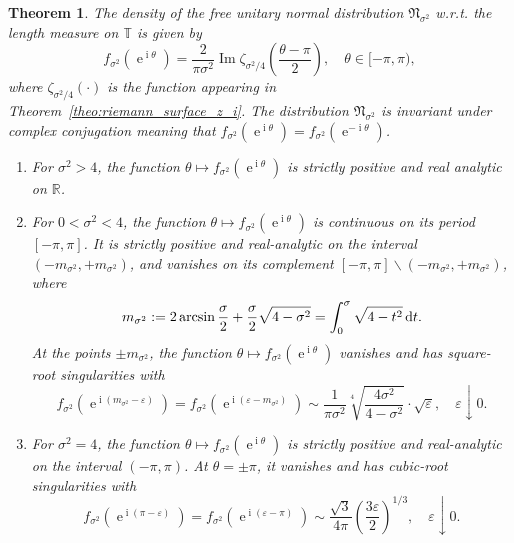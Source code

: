 \documentclass[10pt]{amsart}
\newtheorem{theo}{Theorem}[section]
\theoremstyle{definition}\newtheorem{defi}[theo]{Definition}\newtheorem{rema}[theo]{Remark}\newtheorem{exam}[theo]{Example}\newtheorem{exem}[theo]{Example}\newtheorem{nota}[theo]{Notation}
\DeclareMathOperator{\Imm}{Im}
\DeclareMathOperator{\eee}{e}
\DeclareMathOperator{\ii}{i}
\newcommand{\fnorm}{\mathfrak{N}}
\newcommand{\bT}{\mathbb{T}}
\newcommand{\R}{\mathbb{R}}
\newcommand*\dint{\text{\normalfont d}}
\newcommand{\eps}{\varepsilon}
\newcommand*{\relabel}{\renewcommand{\labelenumi}{(\theenumi)}}
\newcommand*{\alphenumi}{\renewcommand*{\theenumi}{\alph{enumi}}\relabel}
\begin{document}
\begin{theo}\label{theo:properties_free_normal}
The density of the free unitary normal distribution $\fnorm_{\sigma^2}$ w.r.t. the length measure on $\bT$ is given by
\begin{equation}\label{eq:density_free_normal_zeta}
f_{\sigma^2}(\eee^{\ii \theta}) = \frac {2}{\pi \sigma^2} \Imm \zeta_{\sigma^2/4}\left(\frac{\theta - \pi}{2}\right),
\quad
\theta\in [-\pi, \pi),
\end{equation}
where $\zeta_{\sigma^2/4}(\cdot)$ is the function appearing in Theorem~\ref{theo:riemann_surface_z_i}. The distribution $\fnorm_{\sigma^2}$ is invariant under complex conjugation meaning that $f_{\sigma^2}(\eee^{\ii \theta}) = f_{\sigma^2}(\eee^{-\ii \theta})$.
\begin{enumerate}\alphenumi
\item For $\sigma^2>4$, the function $\theta \mapsto f_{\sigma^2}(\eee^{\ii \theta})$ is strictly positive and real analytic on $\R$.
\item For $0<\sigma^2<4$, the function $\theta \mapsto f_{\sigma^2}(\eee^{\ii \theta})$ is continuous on its period $[-\pi,\pi]$. It is strictly positive and real-analytic on the interval $(-m_{\sigma^2}, +m_{\sigma^2})$, and vanishes on its complement $[-\pi,\pi]\backslash (-m_{\sigma^2}, +m_{\sigma^2})$, where
\begin{equation}\label{eq:support_free_normal}
m_{\sigma^2} := 2 \arcsin \frac \sigma 2 + \frac \sigma 2 \sqrt{4- \sigma^2}= \int_0^{\sigma}\sqrt{4-t^2}\, \dint t.
\end{equation}
At the points $\pm m_{\sigma^2}$, the function $\theta \mapsto f_{\sigma^2}(\eee^{\ii \theta})$ vanishes and has square-root singularities with
\begin{equation}\label{eq:square_root_sing}
f_{\sigma^2}\left(\eee^{\ii \left(m_{\sigma^2} - \eps\right)}\right) = f_{\sigma^2}\left(\eee^{\ii \left(\eps - m_{\sigma^2}\right)}\right)
\sim
\frac {1}{\pi \sigma^2} \sqrt[4]{\frac{4\sigma^2}{4 - \sigma^2}} \cdot \sqrt \eps,
\quad
\eps\downarrow 0.
\end{equation}
\item For $\sigma^2 = 4$, the function $\theta \mapsto f_{\sigma^2}(\eee^{\ii \theta})$ is strictly positive and real-analytic on the interval $(-\pi, \pi)$. At $\theta = \pm \pi$, it vanishes and has cubic-root singularities with
\begin{equation}\label{eq:critical_cubic_root_sing}
f_{\sigma^2}\left(\eee^{\ii (\pi -\eps)}\right) = f_{\sigma^2}\left(\eee^{\ii (\eps - \pi)}\right) \sim \frac{\sqrt 3}{4\pi} \left(\frac{3\eps}{2}\right)^{1/3},
\quad
\eps\downarrow 0.
\end{equation}
\end{enumerate}
\end{theo}
\end{document}
